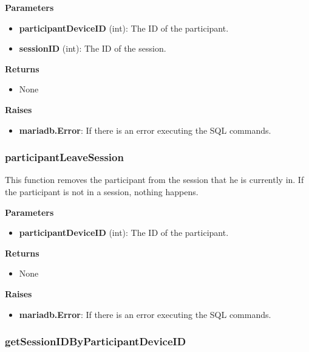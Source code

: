 \documentclass[oneside, ngerman]{sdqtechreport}
\begin{document}
\textbf{Parameters}

\begin{itemize}
    \item \textbf{participantDeviceID} (int): The ID of the participant.
    \item \textbf{sessionID} (int): The ID of the session.
\end{itemize}

\textbf{Returns}

\begin{itemize}
    \item None
\end{itemize}

\textbf{Raises}

\begin{itemize}
    \item \textbf{mariadb.Error}: If there is an error executing the SQL commands.
\end{itemize}

\subsubsection{participantLeaveSession}

This function removes the participant from the session that he is currently in. If the participant is not in a session, nothing happens.

\textbf{Parameters}

\begin{itemize}
    \item \textbf{participantDeviceID} (int): The ID of the participant.
\end{itemize}

\textbf{Returns}

\begin{itemize}
    \item None
\end{itemize}

\textbf{Raises}

\begin{itemize}
    \item \textbf{mariadb.Error}: If there is an error executing the SQL commands.
\end{itemize}

\subsubsection{getSessionIDByParticipantDeviceID}
\end{document}
